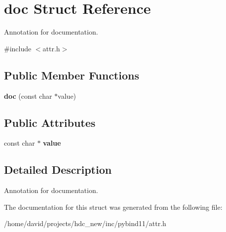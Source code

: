 \hypertarget{structdoc}{}\section{doc Struct Reference}
\label{structdoc}


Annotation for documentation.  




{\ttfamily \#include $<$attr.\+h$>$}

\subsection*{Public Member Functions}
\begin{DoxyCompactItemize}
\item 
{\bfseries doc} (const char $\ast$value)\hypertarget{structdoc_a6240bc454590bc1e217125271b401c08}{}\label{structdoc_a6240bc454590bc1e217125271b401c08}

\end{DoxyCompactItemize}
\subsection*{Public Attributes}
\begin{DoxyCompactItemize}
\item 
const char $\ast$ {\bfseries value}\hypertarget{structdoc_a31cf9e16020b36cd9bdbff3680aca533}{}\label{structdoc_a31cf9e16020b36cd9bdbff3680aca533}

\end{DoxyCompactItemize}


\subsection{Detailed Description}
Annotation for documentation. 

The documentation for this struct was generated from the following file\+:\begin{DoxyCompactItemize}
\item 
/home/david/projects/hdc\+\_\+new/inc/pybind11/attr.\+h\end{DoxyCompactItemize}
